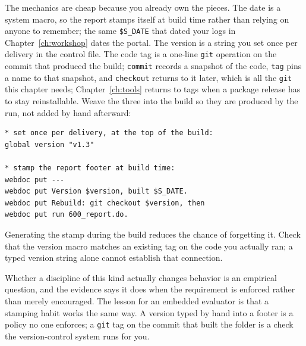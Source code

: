 The mechanics are cheap because you already own the pieces. The date is a system macro, so the report stamps itself at build time rather than relying on anyone to remember; the same \texttt{\$S\_DATE} that dated your logs in Chapter~\ref{ch:workshop} dates the portal. The version is a string you set once per delivery in the control file. The code tag is a one-line \texttt{git} operation on the commit that produced the build; \texttt{commit} records a snapshot of the code, \texttt{tag} pins a name to that snapshot, and \texttt{checkout} returns to it later, which is all the \texttt{git} this chapter needs; Chapter~\ref{ch:tools} returns to tags when a package release has to stay reinstallable. Weave the three into the build so they are produced by the run, not added by hand afterward:
\par
{\footnotesize
\begin{verbatim}
* set once per delivery, at the top of the build:
global version "v1.3"

* stamp the report footer at build time:
webdoc put ---
webdoc put Version $version, built $S_DATE.
webdoc put Rebuild: git checkout $version, then
webdoc put run 600_report.do.
\end{verbatim}
}
Generating the stamp during the build reduces the chance of forgetting it. Check that the version macro matches an existing tag on the code you actually ran; a typed version string alone cannot establish that connection.

Whether a discipline of this kind actually changes behavior is an empirical question, and the evidence says it does when the requirement is enforced rather than merely encouraged. The lesson for an embedded evaluator is that a stamping habit works the same way. A version typed by hand into a footer is a policy no one enforces; a \texttt{git} tag on the commit that built the folder is a check the version-control system runs for you.

